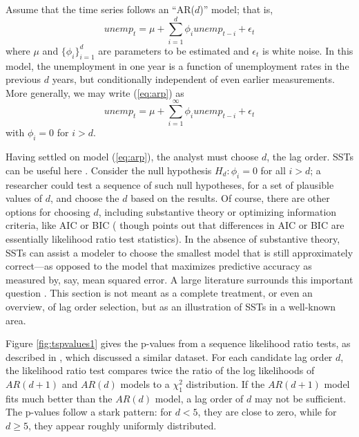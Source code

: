 \documentclass[12pt]{article}\usepackage[]{graphicx}\usepackage[]{color}
\begin{document}
Assume that the time series follows an ``AR($d$)'' model; that is,
\begin{equation}\label{eq:arp}
unemp_t=\mu + \displaystyle\sum_{i=1}^d \phi_i unemp_{t-i}+\epsilon_t
\end{equation}
where $\mu$ and $\{\phi_i\}_{i=1}^d$ are parameters to be estimated
and $\epsilon_t$ is white noise.
In this model, the unemployment in one year is a function of
unemployment rates in the previous $d$ years, but conditionally
independent of even earlier measurements.
More generally, we may write (\ref{eq:arp}) as
\begin{equation}\label{eq:arpinf}
unemp_t=\mu+\displaystyle\sum_{i=1}^\infty \phi_i
unemp_{t-i}+\epsilon_t
\end{equation}
with $\phi_i=0$ for $i>d$.

Having settled on model (\ref{eq:arp}), the analyst must choose $d$,
the lag order.
SSTs can be useful here \citep[e.g.][]{practitionersGuide}.
Consider the null hypothesis $H_d: \phi_i=0$ for all $i>d$;
a researcher could test a sequence of such null hypotheses, for a set
of plausible values of $d$, and choose the $d$ based on the results.
Of course, there are other options for choosing $d$, including
substantive theory or optimizing
information criteria, like AIC or BIC
(\citep{akaike1969fitting,schwarz1978estimating} though
\citealt{potscher1991effects} points out that differences in AIC or
BIC are essentially likelihood ratio test statistics).
In the absence of substantive theory, SSTs can assist a modeler to
choose the smallest model that is still approximately correct---as
opposed to the model that maximizes predictive accuracy as measured
by, say, mean squared error.
A large literature surrounds this important question \citep[See,
e.g.][and the citations
therein]{mcquarrie1998regression,liew2004lag}. This section is not
meant as a complete treatment, or even an overview, of lag order
selection, but as an illustration of SSTs in a well-known area.

Figure \ref{fig:tspvalues1} gives the p-values from a sequence
likelihood ratio tests, as described in \citet[][Ch.1]{urca}, which
discussed a similar dataset.
For each candidate lag order $d$, the likelihood ratio test compares
twice the ratio of the log likelihoods of $AR(d+1)$ and $AR(d)$ models
to a $\chi^2_1$ distribution.
If the $AR(d+1)$ model fits much better than the $AR(d)$ model, a lag
order of $d$ may not be sufficient.
The p-values follow a stark pattern: for $d<5$, they are close to
zero, while for $d\ge5$, they appear roughly uniformly distributed.
\end{document}
